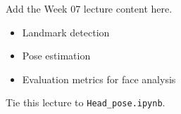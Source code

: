 Add the Week 07 lecture content here.

\begin{itemize}
  \item Landmark detection
  \item Pose estimation
  \item Evaluation metrics for face analysis
\end{itemize}

Tie this lecture to \texttt{Head\_pose.ipynb}.
